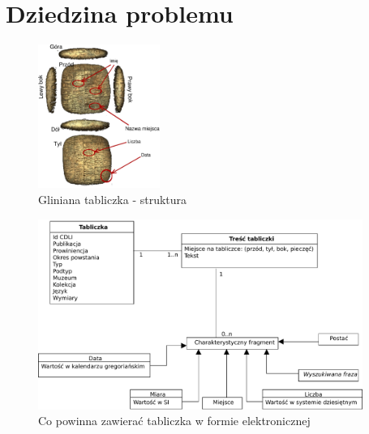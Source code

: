 \chapter{Dziedzina problemu}

\begin{figure}
 \centering
 \includegraphics[width=150px]{../diagramy/tabliczka.pdf}
 \caption{Gliniana tabliczka - struktura}
\end{figure}



\begin{figure}
 \centering
 \includegraphics[width=400px]{../diagramy/Model-dziedziny.pdf}
 \caption{Co powinna zawierać tabliczka w formie elektronicznej}
\end{figure}
~ 


